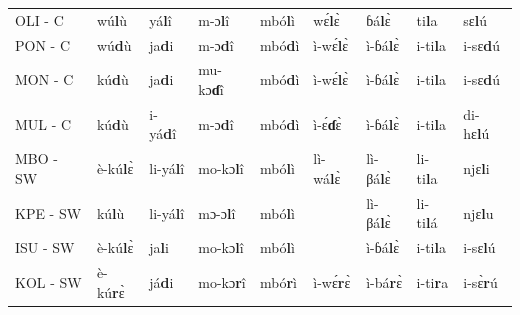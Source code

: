 \documentclass[output=paper,colorlinks,citecolor=brown
]{langscibook}
\begin{document}
\begin{table}
{\begin{tabular}{lllllllll}
OLI - C                   & wú\textbf{l}ù                   & yá\textbf{l}î                    & m-ɔ\textbf{l}î                 & mbó\textbf{l}ì                & wɛ́\textbf{l}ɛ̀                       & ɓá\textbf{l}ɛ̀                 & ti\textbf{l}a                    & sɛ\textbf{l}ú                   \\
PON - C                   & wú\textbf{d}ù                   & ja\textbf{d}i                    & m-ɔ\textbf{d}î                 & mbó\textbf{d}ì                & ì-wɛ́\textbf{l}ɛ̀                    & ì-ɓá\textbf{l}ɛ̀              & i-ti\textbf{l}a                  & i-sɛ\textbf{d}ú                 \\
MON - C                   & kú\textbf{d}ù                   & ja\textbf{d}i                    & mu-kɔ\textbf{ɗ}î               & mbó\textbf{d}ì                & ì-wɛ́\textbf{l}ɛ̀                    & ì-ɓá\textbf{l}ɛ̀              & i-ti\textbf{l}a                  & i-sɛ\textbf{d}ú                 \\
MUL - C                   & kú\textbf{d}ù                   & i-yá\textbf{d}î                  & m-ɔ\textbf{d}î                 & mbó\textbf{d}ì                & ì-ɛ́\textbf{ɗ}ɛ̀                     & ì-ɓá\textbf{l}ɛ̀              & i-ti\textbf{l}a                  & di-hɛ\textbf{l}ú                \\
MBO - SW                  & è-kú\textbf{l}ɛ̀                & li-yá\textbf{l}î                 & mo-kɔ\textbf{l}î               & mbó\textbf{l}ì                & lì-wá\textbf{l}ɛ̀                   & lì-βá\textbf{l}ɛ̀             & li-ti\textbf{l}a                 & njɛ\textbf{l}i                   \\
KPE - SW                  & kú\textbf{l}ù                   & li-yá\textbf{l}î                 & mɔ-ɔ\textbf{l}î                & mbó\textbf{l}ì                &                              & lì-βá\textbf{l}ɛ̀             & li-ti\textbf{l}á                & njɛ\textbf{l}u                   \\
ISU - SW                  & è-kú\textbf{l}ɛ̀                & ja\textbf{l}i                    & mo-kɔ\textbf{l}î               & mbó\textbf{l}ì                &                              & ì-ɓá\textbf{l}ɛ̀              & i-ti\textbf{l}a                  & i-sɛ\textbf{l}ú                 \\
KOL - SW                  & è-kú\textbf{r}ɛ̀                & já\textbf{d}i                    & mo-kɔ\textbf{r}î               & mbó\textbf{r}ì                & ì-wɛ́\textbf{r}ɛ̀                    & ì-bá\textbf{r}ɛ̀              & i-ti\textbf{r}a                  & i-sɛ̀\textbf{r}ú                \\

\end{tabular}}
\end{table}
\end{document}
